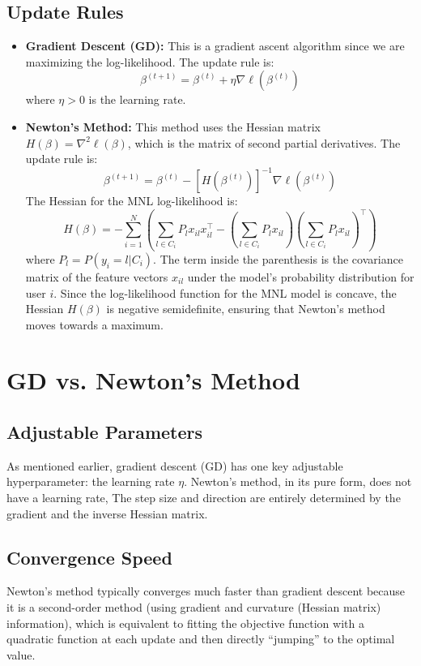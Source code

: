 \documentclass[11pt, a4paper, oneside]{memoir}
\begin{document}
\subsection{Update Rules}
\begin{itemize}
    \item \textbf{Gradient Descent (GD):} This is a gradient ascent algorithm since we are maximizing the log-likelihood. The update rule is:
          \[ \beta^{(t+1)} = \beta^{(t)} + \eta \nabla\ell(\beta^{(t)}) \]
          where $\eta > 0$ is the learning rate.
    \item \textbf{Newton's Method:} This method uses the Hessian matrix $H(\beta) = \nabla^2 \ell(\beta)$, which is the matrix of second partial derivatives. The update rule is:
          \[ \beta^{(t+1)} = \beta^{(t)} - [H(\beta^{(t)})]^{-1} \nabla\ell(\beta^{(t)}) \]
          The Hessian for the MNL log-likelihood is:
          \[ H(\beta) = -\sum_{i=1}^{N} \left( \sum_{l \in C_i} P_l x_{il} x_{il}^\top - \left(\sum_{l \in C_i} P_l x_{il}\right) \left(\sum_{l \in C_i} P_l x_{il}\right)^\top \right) \]
          where $P_l = P(y_i = l | C_i)$. The term inside the parenthesis is the covariance matrix of the feature vectors $x_{il}$
          under the model's probability distribution for user $i$.
          Since the log-likelihood function for the MNL model is concave,
          the Hessian $H(\beta)$ is negative semidefinite, ensuring that Newton's method moves towards a maximum.
\end{itemize}

\section{GD vs. Newton's Method}
\subsection{Adjustable Parameters}
As mentioned earlier, gradient descent (GD) has one key adjustable hyperparameter: the learning rate $\eta$.
Newton's method, in its pure form, does not have a learning rate\footnotemark,
The step size and direction are entirely determined by the gradient and the inverse Hessian matrix.

\subsection{Convergence Speed}
Newton's method typically converges much faster than gradient descent because it is a second-order method (using gradient and curvature (Hessian matrix) information),
which is equivalent to fitting the objective function with a quadratic function at each update and then directly ``jumping'' to the optimal value.
\end{document}
